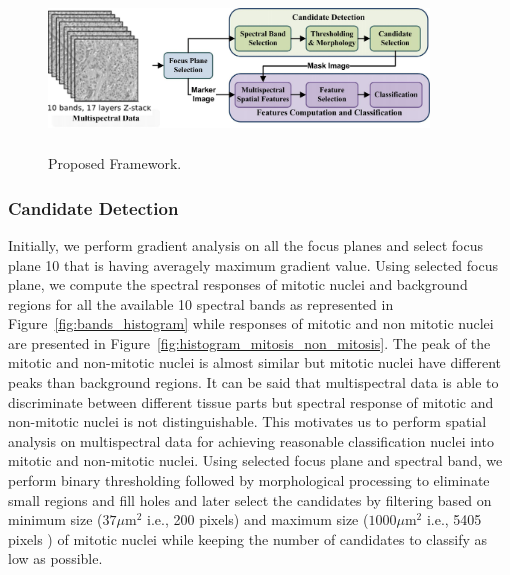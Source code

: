 \documentclass[10pt,twocolumn,letterpaper]{article}
\begin{document}
\begin{figure}
	\centering
	\includegraphics[width=0.9\textwidth, height=43mm]{diagrams/framework.jpg}
	\caption{Proposed Framework.}
	\label{fig:framework}
\end{figure}

\subsubsection{Candidate Detection}
Initially, we perform gradient analysis on all the focus planes and select focus plane 10 that is having averagely maximum gradient value. Using selected focus plane, we compute the spectral responses of mitotic nuclei and background regions for all the available 10 spectral bands as represented in Figure~\ref{fig:bands_histogram} while responses of mitotic and non mitotic nuclei are presented in Figure~\ref{fig:histogram_mitosis_non_mitosis}. The peak of the mitotic and non-mitotic nuclei is almost similar but mitotic nuclei have different peaks than background regions. It can be said that multispectral data is able to discriminate between different tissue parts but spectral response of mitotic and non-mitotic nuclei is not distinguishable. This motivates us to perform spatial analysis on multispectral data for achieving reasonable classification nuclei into mitotic and non-mitotic nuclei. Using selected focus plane and spectral band, we perform binary thresholding followed by morphological processing to eliminate small regions and fill holes and later select the candidates by filtering based on minimum size ($37\mu\text{m}^2$ i.e., 200 pixels) and maximum size ($1000\mu\text{m}^2$ i.e., 5405 pixels ) of mitotic nuclei while keeping the number of candidates to classify as low as possible. 
\end{document}
